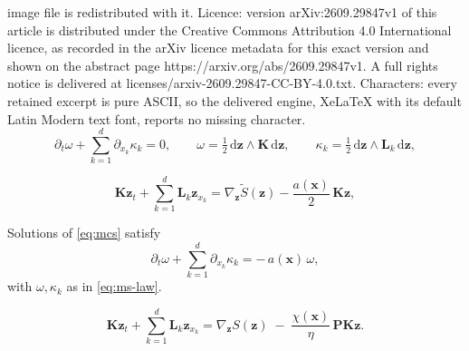 \documentclass[10pt,a4paper]{amsart}
\newcommand{\bK}{\bm{K}}
\newcommand{\bL}{\bm{L}}
\newcommand{\bP}{\bm{P}}
\newcommand{\bx}{\bm{x}}
\newcommand{\bz}{\bm{z}}
\newcommand{\chixx}{\chi(\bx)}
\newcommand{\dd}{\mathrm{d}}
\begin{document}
image file is redistributed with it. Licence: version arXiv:2609.29847v1 of this article is distributed under the Creative Commons Attribution 4.0 International licence, as recorded in the arXiv licence metadata for this exact version and shown on the abstract page https://arxiv.org/abs/2609.29847v1. A full rights notice is delivered at licenses/arxiv-2609.29847-CC-BY-4.0.txt. Characters: every retained excerpt is pure ASCII, so the delivered engine, XeLaTeX with its default Latin Modern text font, reports no missing character.
\begin{equation}
\label{eq:ms-law}
\partial_t\omega + \sum_{k=1}^{d}\partial_{x_k}\kappa_k = 0,
\qquad
\omega = \tfrac12\,\dd\bz\wedge\bK\,\dd\bz,
\qquad
\kappa_k = \tfrac12\,\dd\bz\wedge\bL_k\,\dd\bz,
\end{equation}

\begin{equation}
\label{eq:mcs}
\bK\bz_t + \sum_{k=1}^{d}\bL_k\bz_{x_k}
= \nabla_{\bz} \widetilde S(\bz) - \frac{a(\bx)}{2}\,\bK\bz ,
\end{equation}

\begin{proposition}
\label{prop:mcs-law}
Solutions of \eqref{eq:mcs} satisfy
\begin{equation}
\label{eq:mcs-law}
\partial_t \omega + \sum_{k=1}^{d}\partial_{x_k} \kappa_k
= -\,a(\bx)\,\omega ,
\end{equation}
with $\omega,\kappa_k$ as in \eqref{eq:ms-law}.
\end{proposition}

\begin{equation}
\label{eq:penalised}
\bK\bz_t + \sum_{k=1}^{d}\bL_k\bz_{x_k}
= \nabla_{\bz}S(\bz) \;-\; \frac{\chixx}{\eta}\,\bP\bK\bz .
\end{equation}
\end{document}
